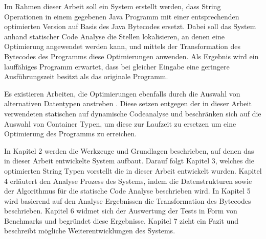 Im Rahmen dieser Arbeit soll ein System erstellt werden, dass String Operationen in einem
gegebenen Java Programm mit einer entsprechenden optimierten Version auf Basis des 
Java Bytecodes ersetzt. Dabei soll das System anhand statischer Code Analyse die Stellen
lokalisieren, an denen eine Optimierung angewendet werden kann, und mittels der Transformation des 
Bytecodes des Programms diese Optimierungen anwenden. Als Ergebnis wird ein lauffähiges
Programm erwartet, dass bei gleicher Eingabe eine geringere Ausführungszeit besitzt 
als das originale Programm.

Es existieren Arbeiten, die Optimierungen ebenfalls durch die Auswahl von alternativen
Datentypen anstreben \cite{coco, cham, brain}. Diese setzen entgegen der in dieser Arbeit 
verwendeten statischen auf dynamische Codeanalyse und beschränken sich auf die Auswahl von 
Container Typen, um diese zur Laufzeit zu ersetzen um eine Optimierung des Programms zu erreichen.

In Kapitel 2 werden die Werkzeuge und Grundlagen beschrieben, auf denen das in dieser Arbeit
entwickelte System aufbaut. Darauf folgt Kapitel 3, welches die optimierten String Typen vorstellt
die in dieser Arbeit entwickelt wurden. Kapitel 4 erläutert den Analyse Prozess des Systems, indem
die Datenstrukturen sowie der Algorithmus für die statische Code Analyse beschrieben wird.
In Kapitel 5 wird basierend auf den Analyse Ergebnissen die Transformation des Bytecodes 
beschrieben. Kapitel 6 widmet sich der Auswertung der Tests in Form von Benchmarks
und begründet diese Ergebnisse. Kapitel 7 zieht ein Fazit und beschreibt mögliche
Weiterentwicklungen des Systems.    